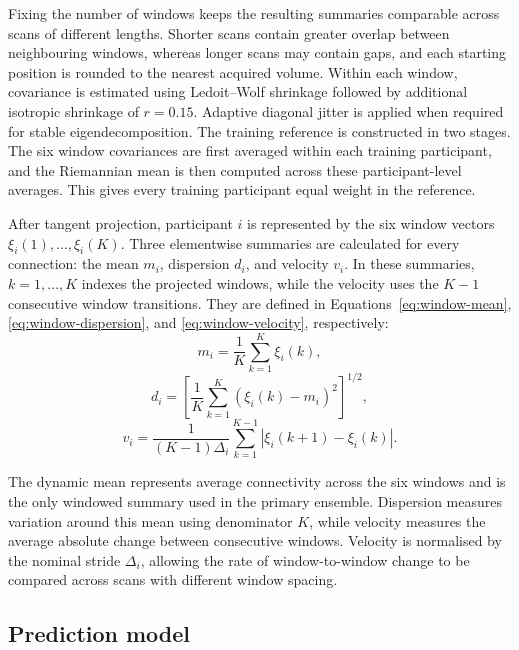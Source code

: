 Fixing the number of windows keeps the resulting summaries comparable across scans of different lengths. Shorter scans contain greater overlap between neighbouring windows, whereas longer scans may contain gaps, and each starting position is rounded to the nearest acquired volume. Within each window, covariance is estimated using Ledoit--Wolf shrinkage followed by additional isotropic shrinkage of $r=0.15$. Adaptive diagonal jitter is applied when required for stable eigendecomposition. The training reference is constructed in two stages. The six window covariances are first averaged within each training participant, and the Riemannian mean is then computed across these participant-level averages. This gives every training participant equal weight in the reference.

After tangent projection, participant $i$ is represented by the six window vectors $\xi_i(1),\ldots,\xi_i(K)$. Three elementwise summaries are calculated for every connection: the mean $m_i$, dispersion $d_i$, and velocity $v_i$. In these summaries, $k=1,\ldots,K$ indexes the projected windows, while the velocity uses the $K-1$ consecutive window transitions. They are defined in Equations~\eqref{eq:window-mean}, \eqref{eq:window-dispersion}, and \eqref{eq:window-velocity}, respectively:
\begin{equation}
m_i
=
\frac{1}{K}\sum_{k=1}^{K}\xi_i(k),
\label{eq:window-mean}
\end{equation}
\begin{equation}
d_i
=
\left[
\frac{1}{K}
\sum_{k=1}^{K}
\left(\xi_i(k)-m_i\right)^2
\right]^{1/2},
\label{eq:window-dispersion} %
\end{equation}
\begin{equation}
v_i
=
\frac{1}{(K-1)\Delta_i}
\sum_{k=1}^{K-1}
\left|\xi_i(k+1)-\xi_i(k)\right|.
\label{eq:window-velocity} %
\end{equation}

The dynamic mean represents average connectivity across the six windows and is the only windowed summary used in the primary ensemble. Dispersion measures variation around this mean using denominator $K$, while velocity measures the average absolute change between consecutive windows. Velocity is normalised by the nominal stride $\Delta_i$, allowing the rate of window-to-window change to be compared across scans with different window spacing.

\subsection{Prediction model}
\label{subsec:prediction-model}

